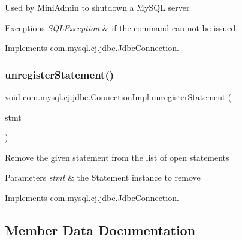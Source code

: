 Used by Mini\+Admin to shutdown a My\+S\+QL server


\begin{DoxyExceptions}{Exceptions}
{\em S\+Q\+L\+Exception} & if the command can not be issued. \\
\hline
\end{DoxyExceptions}


Implements \mbox{\hyperlink{interfacecom_1_1mysql_1_1cj_1_1jdbc_1_1_jdbc_connection_ad9bedf228ed2ec194197ac2ceb960a94}{com.\+mysql.\+cj.\+jdbc.\+Jdbc\+Connection}}.

\mbox{\label{classcom_1_1mysql_1_1cj_1_1jdbc_1_1_connection_impl_a5f86d22252d24d3b0ddf4cb2c7afd4b7}} 
\subsubsection{\texorpdfstring{unregister\+Statement()}{unregisterStatement()}}
{\footnotesize\ttfamily void com.\+mysql.\+cj.\+jdbc.\+Connection\+Impl.\+unregister\+Statement (\begin{DoxyParamCaption}\item[{\mbox{\hyperlink{interfacecom_1_1mysql_1_1cj_1_1jdbc_1_1_jdbc_statement}{Jdbc\+Statement}}}]{stmt }\end{DoxyParamCaption})}

Remove the given statement from the list of open statements


\begin{DoxyParams}{Parameters}
{\em stmt} & the Statement instance to remove \\
\hline
\end{DoxyParams}


Implements \mbox{\hyperlink{interfacecom_1_1mysql_1_1cj_1_1jdbc_1_1_jdbc_connection}{com.\+mysql.\+cj.\+jdbc.\+Jdbc\+Connection}}.



\subsection{Member Data Documentation}
\mbox{\label{classcom_1_1mysql_1_1cj_1_1jdbc_1_1_connection_impl_a295bb978a807c45f66c387a587a25d36}} 
